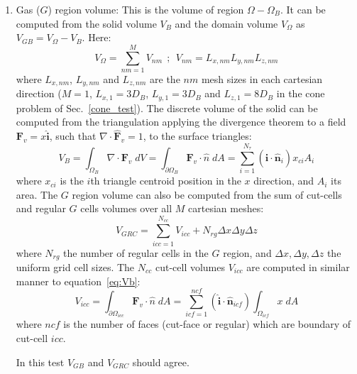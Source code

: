 \documentclass[11pt]{book}
\begin{document}
\begin{enumerate}
    \item Gas ($G$) region volume:
    This is the volume of region $\Omega-\Omega_B$. It can be computed from the solid volume $V_B$ and the domain volume $V_\Omega$ as $V_{GB}=V_\Omega-V_B$. Here:
    \begin{equation}
       V_\Omega=\sum_{nm=1}^M {V_{nm}} \: \: ; \: \: V_{nm}=L_{x,nm} L_{y,nm} L_{z,nm}
    \end{equation}
    where $L_{x,nm}$, $L_{y,nm}$ and $L_{z,nm}$ are the $nm$ mesh sizes in each cartesian direction ($M=1$, $L_{x,1}=3D_B$, $L_{y,1}=3D_B$ and $L_{z,1}=8D_B$ in the cone problem of Sec.~\ref{cone_test}). The discrete volume of the solid can be computed from the triangulation applying the divergence theorem to a field $\mathbf{F}_v=x \mathbf{\hat{i}}$, such that $\nabla \cdot \mathbf{\hat{F}}_v=1$, to the surface triangles:
    \begin{equation}
      V_B = \int_{\Omega _{B}} \nabla \cdot \mathbf{F}_v \; dV =
      \int_{\partial \Omega _{B}}  \mathbf{F}_v \cdot \hat{n} \; dA =
      \sum_{i=1}^{N_\tau}{(\mathbf{\hat{i}} \cdot \mathbf{\hat{n}}_i) x_{ci} A_i}
      \label{eq:Vb}
    \end{equation}
    where $x_{ci}$ is the $i$th triangle centroid position in the $x$ direction, and $A_i$ its area.
    The $G$ region volume can also be computed from the sum of cut-cells and regular $G$ cells volumes over all $M$ cartesian meshes:
    \begin{equation}
       V_{GRC} = \sum_{icc=1}^{N_{cc}}{V_{icc}} + N_{rg} \Delta x \Delta y \Delta z
       \label{}
    \end{equation}
    where $N_{rg}$ the number of regular cells in the $G$ region, and $\Delta x,\Delta y,\Delta z$ the uniform grid cell sizes. The  $N_{cc}$ cut-cell volumes $V_{icc}$ are computed in similar manner to equation~\eqref{eq:Vb}:
    \begin{equation}
    V_{icc} = \int_{\partial \Omega _{icc}}  \mathbf{F}_v \cdot \hat{n} \; dA =
    \sum_{icf=1}^{ncf} (\mathbf{\hat{i}} \cdot \mathbf{\hat{n}}_{icf}) \int_{\Omega _{icf}} x \; dA
    \label{eq:vol2}
    \end{equation}
    where $ncf$ is the number of faces (cut-face or regular) which are boundary of cut-cell $icc$.

    In this test $V_{GB}$ and $V_{GRC}$ should agree.
    \newline


\end{enumerate}
\end{document}
